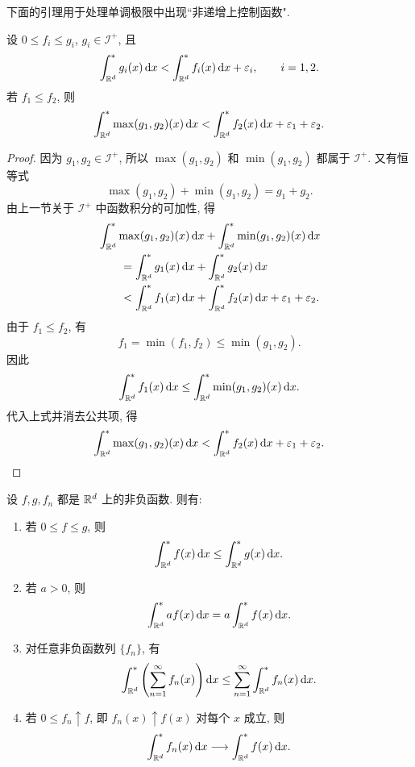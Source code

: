 下面的引理用于处理单调极限中出现``非递增上控制函数".

\begin{lem}
	\label{lem:upper-integral-max-majorant}
	设 \(0\leq f_i\leq g_i\), \(g_i\in\mathcal I^+\), 且
	\[
	\int_{\mathbb{R}^d}^{*}g_i(x)\,\dd x
	<
	\int_{\mathbb{R}^d}^{*}f_i(x)\,\dd x+\varepsilon_i,
	\qquad i=1,2.
	\]
	若 \(f_1\leq f_2\), 则
	\[
	\int_{\mathbb{R}^d}^{*}\max(g_1,g_2)(x)\,\dd x
	<
	\int_{\mathbb{R}^d}^{*}f_2(x)\,\dd x+
	\varepsilon_1+
	\varepsilon_2.
	\]
\end{lem}

\begin{proof}
	因为 \(g_1,g_2\in\mathcal I^+\), 所以 \(\max(g_1,g_2)\) 和 \(\min(g_1,g_2)\) 都属于 \(\mathcal I^+\). 又有恒等式
	\[
	\max(g_1,g_2)+\min(g_1,g_2)=g_1+g_2.
	\]
	由上一节关于 \(\mathcal I^+\) 中函数积分的可加性, 得
	\begin{align*}
		&\int_{\mathbb{R}^d}^{*}\max(g_1,g_2)(x)\,\dd x
		+
		\int_{\mathbb{R}^d}^{*}\min(g_1,g_2)(x)\,\dd x\\
		&\qquad=
		\int_{\mathbb{R}^d}^{*}g_1(x)\,\dd x
		+
		\int_{\mathbb{R}^d}^{*}g_2(x)\,\dd x\\
		&\qquad<
		\int_{\mathbb{R}^d}^{*}f_1(x)\,\dd x
		+
		\int_{\mathbb{R}^d}^{*}f_2(x)\,\dd x
		+
		\varepsilon_1+\varepsilon_2.
	\end{align*}
	由于 \(f_1\leq f_2\), 有
	\[
	f_1=\min(f_1,f_2)\leq \min(g_1,g_2).
	\]
	因此
	\[
	\int_{\mathbb{R}^d}^{*}f_1(x)\,\dd x
	\leq
	\int_{\mathbb{R}^d}^{*}\min(g_1,g_2)(x)\,\dd x.
	\]
	代入上式并消去公共项, 得
	\[
	\int_{\mathbb{R}^d}^{*}\max(g_1,g_2)(x)\,\dd x
	<
	\int_{\mathbb{R}^d}^{*}f_2(x)\,\dd x+
	\varepsilon_1+
	\varepsilon_2.
	\]
\end{proof}

\begin{thm}[上积分的基本性质]
	\label{thm:basic-properties-upper-integral-positive}
	设 \(f,g,f_n\) 都是 \(\mathbb{R}^d\) 上的非负函数. 则有:
	\begin{enumerate}
		\item 若 \(0\leq f\leq g\), 则
		\[
		\int_{\mathbb{R}^d}^{*}f(x)\,\dd x
		\leq
		\int_{\mathbb{R}^d}^{*}g(x)\,\dd x.
		\]
		\item 若 \(a>0\), 则
		\[
		\int_{\mathbb{R}^d}^{*}af(x)\,\dd x
		=
		a\int_{\mathbb{R}^d}^{*}f(x)\,\dd x.
		\]
		\item 对任意非负函数列 \(\{f_n\}\), 有
		\begin{equation}
			\int_{\mathbb{R}^d}^{*}\left(\sum_{n=1}^{\infty}f_n(x)\right)\dd x
			\leq
			\sum_{n=1}^{\infty}\int_{\mathbb{R}^d}^{*}f_n(x)\,\dd x.
			\label{eq:upper-integral-subadditivity-positive}
		\end{equation}
		\item 若 \(0\leq f_n\uparrow f\), 即 \(f_n(x)\uparrow f(x)\) 对每个 \(x\) 成立, 则
		\begin{equation}
			\int_{\mathbb{R}^d}^{*}f_n(x)\,\dd x
			\longrightarrow
			\int_{\mathbb{R}^d}^{*}f(x)\,\dd x.
			\label{eq:upper-integral-monotone-positive}
		\end{equation}
	\end{enumerate}
\end{thm}

